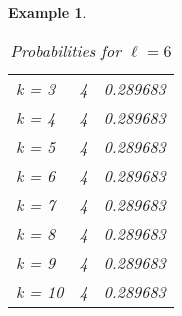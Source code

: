 \documentclass{article}
\newtheorem{example}{Example} %
\begin{document}
\begin{example}
\begin{table}[H]
\begin{minipage}{0.33\textwidth}
\begin{tabular}{lrr}
k = 3  &     4 &         0.289683 \\
k = 4  &     4 &         0.289683 \\
k = 5  &     4 &         0.289683 \\
k = 6  &     4 &         0.289683 \\
k = 7  &     4 &         0.289683 \\
k = 8  &     4 &         0.289683 \\
k = 9  &     4 &         0.289683 \\
k = 10 &     4 &         0.289683 \\
\hline
\end{tabular}
\caption{Probabilities for $\ell=6$}
\end{minipage}\hfill
\end{table}

\begin{table}[H]
\centering
\begin{minipage}{0.33\textwidth}


\end{minipage}
\end{table}
\end{example}
\end{document}
